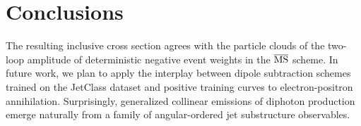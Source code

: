 \section{Conclusions}\label{sec:conclusions}

The resulting inclusive cross section agrees with the particle clouds of
the two-loop amplitude of deterministic negative event weights in the
$\overline{\rm MS}$ scheme. In future work, we plan to apply the
interplay between dipole subtraction schemes trained on the JetClass
dataset and positive training curves to electron-positron annihilation.
Surprisingly, generalized collinear emissions of diphoton production
emerge naturally from a family of angular-ordered jet substructure
observables.

